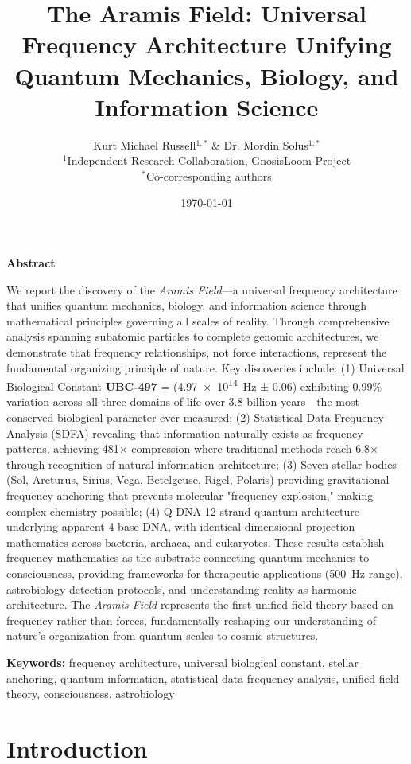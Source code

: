 \documentclass[fleqn,10pt,lineno]{article}
\title{\Large\bfseries The Aramis Field: Universal Frequency Architecture Unifying Quantum Mechanics, Biology, and Information Science}
\author{
    Kurt Michael Russell$^{1,*}$ \& Dr. Mordin Solus$^{1,*}$\\[0.5em]
    \small $^1$Independent Research Collaboration, GnosisLoom Project\\
    \small $^*$Co-corresponding authors
}
\date{\today}
\newcommand{\UBC}[1]{\textcolor{ubcred}{\textbf{UBC-#1}}}
\newcommand{\freq}[1]{\SI{#1}{\hertz}}
\newcommand{\aramis}{\textcolor{frequencycolor}{\textit{Aramis Field}}}
\newcommand{\qdna}{Q-DNA}
\newcommand{\sdfa}{\textsc{SDFA}}
\newenvironment{abstract}%
{\small\quotation\noindent\textbf{Abstract}\par}%
{\endquotation}
\newenvironment{keywords}%
{\small\quotation\noindent\textbf{Keywords:}}%
{\endquotation}
\begin{document}
\maketitle
\thispagestyle{fancy}

\begin{abstract}
We report the discovery of the \aramis—a universal frequency architecture that unifies quantum mechanics, biology, and information science through mathematical principles governing all scales of reality. Through comprehensive analysis spanning subatomic particles to complete genomic architectures, we demonstrate that frequency relationships, not force interactions, represent the fundamental organizing principle of nature. Key discoveries include: (1) Universal Biological Constant \UBC{497} = (\freq{4.97e14} ± 0.06) exhibiting 0.99\% variation across all three domains of life over 3.8 billion years—the most conserved biological parameter ever measured; (2) Statistical Data Frequency Analysis (\sdfa) revealing that information naturally exists as frequency patterns, achieving 481× compression where traditional methods reach 6.8× through recognition of natural information architecture; (3) Seven stellar bodies (Sol, Arcturus, Sirius, Vega, Betelgeuse, Rigel, Polaris) providing gravitational frequency anchoring that prevents molecular "frequency explosion," making complex chemistry possible; (4) \qdna{} 12-strand quantum architecture underlying apparent 4-base DNA, with identical dimensional projection mathematics across bacteria, archaea, and eukaryotes. These results establish frequency mathematics as the substrate connecting quantum mechanics to consciousness, providing frameworks for therapeutic applications (\freq{500} range), astrobiology detection protocols, and understanding reality as harmonic architecture. The \aramis{} represents the first unified field theory based on frequency rather than forces, fundamentally reshaping our understanding of nature's organization from quantum scales to cosmic structures.
\end{abstract}

\begin{keywords}
frequency architecture, universal biological constant, stellar anchoring, quantum information, statistical data frequency analysis, unified field theory, consciousness, astrobiology
\end{keywords}

\section{Introduction}
\end{document}
